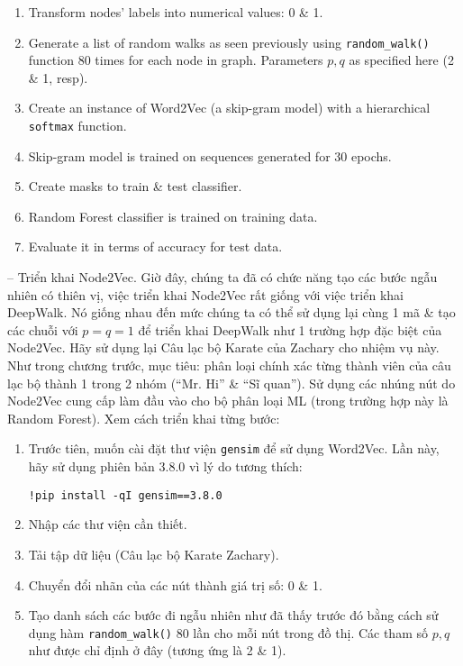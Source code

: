 \documentclass{article}
\begin{document}
\begin{itemize}
\begin{itemize}
\begin{enumerate}
            \item Transform nodes' labels into numerical values: 0 \& 1.
            \item Generate a list of random walks as seen previously using \verb|random_walk()| function 80 times for each node in graph. Parameters $p,q$ as specified here (2 \& 1, resp).
            \item Create an instance of Word2Vec (a skip-gram model) with a hierarchical {\tt softmax} function.
            \item Skip-gram model is trained on sequences generated for 30 epochs.
            \item Create masks to train \& test classifier.
            \item Random Forest classifier is trained on training data.
            \item Evaluate it in terms of accuracy for test data.
        \end{enumerate}
        -- {\sf Triển khai Node2Vec.} Giờ đây, chúng ta đã có chức năng tạo các bước ngẫu nhiên có thiên vị, việc triển khai Node2Vec rất giống với việc triển khai DeepWalk. Nó giống nhau đến mức chúng ta có thể sử dụng lại cùng 1 mã \& tạo các chuỗi với $p = q = 1$ để triển khai DeepWalk như 1 trường hợp đặc biệt của Node2Vec. Hãy sử dụng lại Câu lạc bộ Karate của Zachary cho nhiệm vụ này. Như trong chương trước, mục tiêu: phân loại chính xác từng thành viên của câu lạc bộ thành 1 trong 2 nhóm (``Mr. Hi'' \& ``Sĩ quan''). Sử dụng các nhúng nút do Node2Vec cung cấp làm đầu vào cho bộ phân loại ML (trong trường hợp này là Random Forest). Xem cách triển khai từng bước:
        \begin{enumerate}
            \item Trước tiên, muốn cài đặt thư viện {\tt gensim} để sử dụng Word2Vec. Lần này, hãy sử dụng phiên bản 3.8.0 vì lý do tương thích:
            \begin{verbatim}
!pip install -qI gensim==3.8.0
            \end{verbatim}
            \item Nhập các thư viện cần thiết.
            \item Tải tập dữ liệu (Câu lạc bộ Karate Zachary).
            \item Chuyển đổi nhãn của các nút thành giá trị số: 0 \& 1.
            \item Tạo danh sách các bước đi ngẫu nhiên như đã thấy trước đó bằng cách sử dụng hàm \verb|random_walk()| 80 lần cho mỗi nút trong đồ thị. Các tham số $p,q$ như được chỉ định ở đây (tương ứng là 2 \& 1).

\end{enumerate}
\end{itemize}
\end{itemize}
\end{document}
